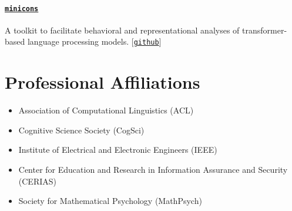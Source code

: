 \documentclass[11pt]{article}
\newcommand{\github}[1]{[\href{#1}{\texttt{github}}]}
\begin{document}
\paragraph{\href{https://pypi.org/project/minicons/}{\texttt{minicons}}} A toolkit to facilitate behavioral and representational analyses of transformer-based language processing models. \github{https://github.com/kanishkamisra/minicons}



\section*{Professional Affiliations}
\begin{itemize}
    \item Association of Computational Linguistics (ACL)
    \item Cognitive Science Society (CogSci)
    \item Institute of Electrical and Electronic Engineers (IEEE)
    \item Center for Education and Research in Information Assurance and Security (CERIAS)
    \item Society for Mathematical Psychology (MathPsych)
\end{itemize}
\end{document}
